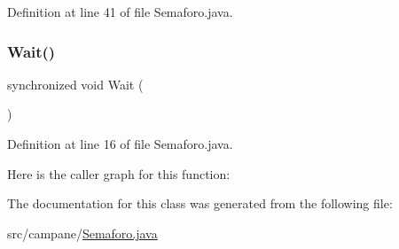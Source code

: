 Definition at line 41 of file Semaforo.\+java.

\mbox{\label{classcampane_1_1_semaforo_afc4e41716e5e0c87146c4d8b199f3c7a}} 
\subsubsection{\texorpdfstring{Wait()}{Wait()}}
{\footnotesize\ttfamily synchronized void Wait (\begin{DoxyParamCaption}{ }\end{DoxyParamCaption})}



Definition at line 16 of file Semaforo.\+java.

Here is the caller graph for this function\+:


The documentation for this class was generated from the following file\+:\begin{DoxyCompactItemize}
\item 
src/campane/\hyperlink{_semaforo_8java}{Semaforo.\+java}\end{DoxyCompactItemize}

